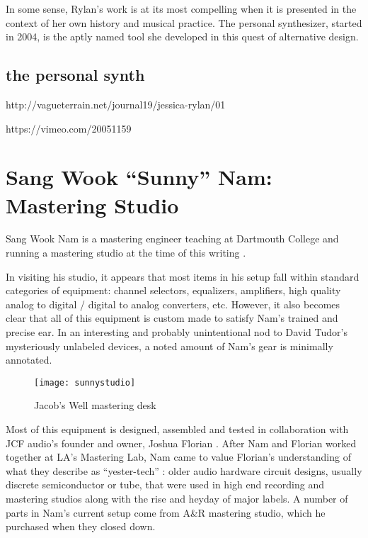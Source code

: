 In some sense, Rylan's work is at its most compelling when it is presented in the context of her own history and musical practice. The personal synthesizer, started in 2004, is the aptly named tool she developed in this quest of alternative design. 

\subsection{the personal synth}

http://vagueterrain.net/journal19/jessica-rylan/01

https://vimeo.com/20051159



\section{Sang Wook ``Sunny'' Nam: Mastering Studio}

Sang Wook Nam is a mastering engineer teaching at Dartmouth College and running a mastering studio at the time of this writing \cite{nam2015}. 

In visiting his studio, it appears that most items in his setup fall within standard categories of equipment: channel selectors, equalizers, amplifiers, high quality analog to digital / digital to analog converters, etc. However, it also becomes clear that all of this equipment is custom made to satisfy Nam's trained and precise ear. In an interesting and probably unintentional nod to David Tudor's mysteriously unlabeled devices, a noted amount of Nam's gear is minimally annotated. 

	\begin{figure}[h!]
	  \caption{Jacob's Well mastering desk}
	  \centering
	    \texttt{[image: sunnystudio]}
	\end{figure}
	
Most of this equipment is designed, assembled and tested in collaboration with JCF audio's founder and owner, Joshua Florian \cite{florian2015}. After Nam and Florian worked together at LA's Mastering Lab, Nam came to value Florian's understanding of what they describe as ``yester-tech'' \cite{florian2015b}: older audio hardware circuit designs, usually discrete semiconductor or tube, that were used in high end recording and mastering studios along with the rise and heyday of major labels. A number of parts in Nam's current setup come from A\&R mastering studio, which he purchased when they closed down. 

